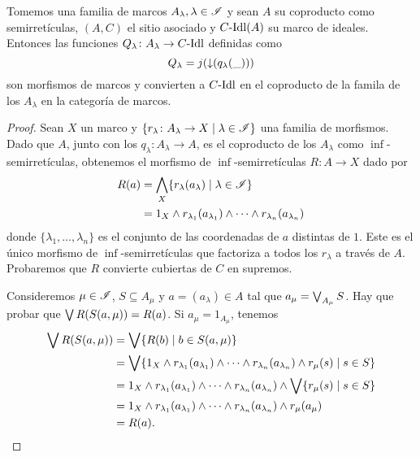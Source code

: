 \begin{lemma}
  Tomemos una familia de marcos $A_\lambda, \lambda\in\mathscr{I}$ y sean
  $A$ su coproducto como semirretículas, $(A,C)$ el sitio asociado y
  $C\text{-}\mathrm{Idl}(A)$ su marco de ideales. Entonces las funciones
  $Q_\lambda\colon A_\lambda\to C\text{-}\mathrm{Idl}$ definidas como
    \[
        Q_\lambda=j({\downarrow}(q_\lambda(\_)))
    \]
  son morfismos de marcos y convierten a $C\text{-}\mathrm{Idl}$ 
  en el coproducto de la famila de los $A_\lambda$
  en la categoría de marcos.
\end{lemma}
\begin{proof}
Sean $X$ un marco y
$\{r_\lambda\colon A_\lambda\to X\mid \lambda\in \mathscr{I}\}$
una familia de morfismos.
Dado que $A$, junto con los $q_\lambda:A_\lambda\to A$,
es el coproducto de los $A_\lambda$ como $\inf$-semirretículas,
obtenemos el morfismo de $\inf$-semirretículas
$R\colon A\to X$ dado por
\begin{align*}
    R(a)
    &=\bigwedge_X \{r_\lambda(a_\lambda)\mid \lambda\in\mathscr{I}\} \\
    &= 1_X\wedge r_{\lambda_1}(a_{\lambda_1})\wedge\cdots\wedge r_{\lambda_n}(a_{\lambda_n})
\end{align*}
donde $\{\lambda_1,\dots,\lambda_n\}$ es el conjunto
de las coordenadas de $a$ distintas de $1$.
Este es el único morfismo de $\inf$-semirretículas que
factoriza a todos los $r_\lambda$ a través de $A$.
Probaremos que $R$ convierte cubiertas de $C$ en supremos.

Consideremos $\mu\in\mathscr{I}$, $S\subseteq A_\mu$ y $a=(a_\lambda)\in A$ tal que $a_\mu=\bigvee_{A_\mu} S$.
Hay que probar que $\bigvee R(S(a,\mu)) = R(a)$.
Si $a_\mu= 1_{A_\mu}$, tenemos
\begin{align*}
    \bigvee R(S(a,\mu))
    &= \bigvee\{R(b) \mid b\in S(a,\mu)\} \\
    &= \bigvee\{ 1_X\wedge r_{\lambda_1}(a_{\lambda_1})\wedge
        \cdots\wedge r_{\lambda_n}(a_{\lambda_n}) \wedge r_\mu(s) \mid s\in S\} \\
    &= 1_X\wedge r_{\lambda_1}(a_{\lambda_1})\wedge
        \cdots\wedge r_{\lambda_n}(a_{\lambda_n}) \wedge
        \bigvee\{ r_\mu(s) \mid s\in S\} \\
    &= 1_X\wedge r_{\lambda_1}(a_{\lambda_1})\wedge
        \cdots\wedge r_{\lambda_n}(a_{\lambda_n}) \wedge
        r_\mu(a_\mu) \\
    &= R(a).
\end{align*}


\end{proof}
